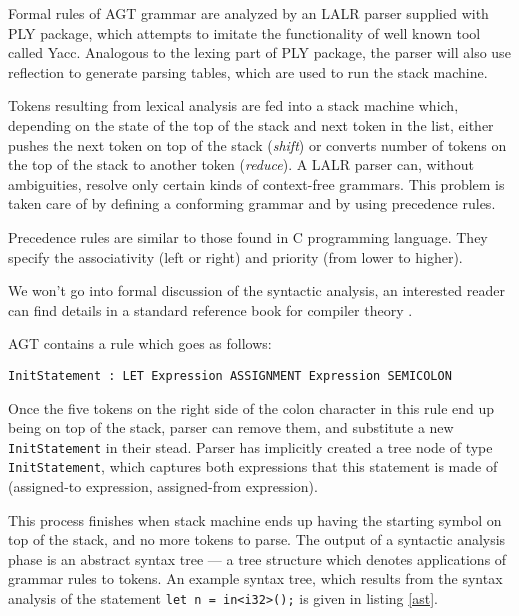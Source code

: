 \documentclass[times, utf8, diplomski]{fer}
\theoremstyle{definition}
\newcommand{\textcode}[3]{
    
}
\begin{document}
Formal rules of AGT grammar are analyzed by an LALR parser supplied with PLY package, which attempts
to imitate the functionality of well known tool called Yacc. Analogous to the lexing part of PLY package, 
the parser will also use reflection to generate parsing tables, which are used to run the stack machine.

Tokens resulting from lexical analysis are fed into a stack machine which,
depending on the state of the top of the stack and next token in the list,
either pushes the next token on top of the stack (\textit{shift}) or converts
number of tokens on the top of the stack to another token (\textit{reduce}).
A LALR parser can, without ambiguities, resolve only certain kinds of context-free grammars.
This problem is taken care of by defining a conforming grammar and by using precedence rules.

\textcode{\resdir/compiler/prio}{prio}{Precedence rules}

Precedence rules are similar to those found in C programming language.
They specify the associativity (left or right) and priority (from lower to higher).

We won't go into formal discussion of the syntactic analysis,
an interested reader can find details in a standard reference book for
compiler theory \citep{c_compilers_book}. 

AGT contains a rule which goes as follows: 

\begin{center}
\texttt{InitStatement : LET Expression ASSIGNMENT Expression SEMICOLON}
\end{center}

Once the five tokens on the right side of the colon character in this rule end up being
on top of the stack, parser can remove them, and substitute a new \texttt{InitStatement} in their stead.
Parser has implicitly created a tree node of type \texttt{InitStatement}, which captures both expressions that
this statement is made of (assigned-to expression, assigned-from expression).

This process finishes when stack machine ends up having the starting symbol on top of the stack,
and no more tokens to parse. 
The output of a syntactic analysis phase is an abstract syntax tree --- a tree structure
which denotes applications of grammar rules to tokens. An example syntax tree, which
results from the syntax analysis of the statement \texttt{let n = in<i32>();} is given in listing \ref{ast}.

\textcode{\resdir/compiler/ast}{ast}{AST resulting from \texttt{let n = in<i32>();}}
\end{document}
